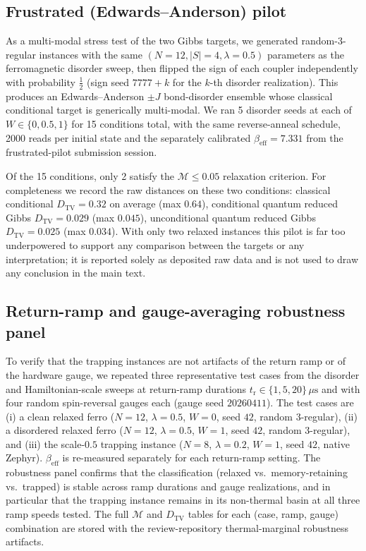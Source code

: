 \documentclass[aps,prapplied,reprint,superscriptaddress,floatfix,nofootinbib]{revtex4-2}
\begin{document}
\subsection{Frustrated (Edwards--Anderson) pilot}
\label{sec:phase6_frustrated}

As a multi-modal stress test of the two Gibbs targets, we generated
random-3-regular instances with the same $(N=12, |S|=4, \lambda=0.5)$
parameters as the ferromagnetic disorder sweep, then flipped the sign of each coupler
independently with probability $\tfrac12$ (sign seed $7777+k$ for the
$k$-th disorder realization).  This produces an Edwards--Anderson $\pm J$
bond-disorder ensemble whose classical conditional target is generically
multi-modal.  We ran 5 disorder seeds at each of $W\in\{0,0.5,1\}$ for
15 conditions total, with the same reverse-anneal schedule, 2000
reads per initial state and the separately calibrated
$\beta_\mathrm{eff}=7.331$ from the frustrated-pilot submission session.

Of the 15 conditions, only 2 satisfy the $\mathcal{M}\le0.05$ relaxation
criterion.  For completeness we record the raw distances on these two
conditions: classical conditional $D_\mathrm{TV}=0.32$ on average (max
$0.64$), conditional quantum reduced Gibbs $D_\mathrm{TV}=0.029$ (max
$0.045$), unconditional quantum reduced Gibbs $D_\mathrm{TV}=0.025$ (max
$0.034$).  With only two relaxed instances this pilot is far too
underpowered to support any comparison between the targets or any
interpretation; it is reported solely as deposited raw data and is not
used to draw any conclusion in the main text.

\subsection{Return-ramp and gauge-averaging robustness panel}
\label{sec:phase6_robustness}

To verify that the trapping instances are not artifacts of the return
ramp or of the hardware gauge, we repeated three representative test
cases from the disorder and Hamiltonian-scale sweeps at return-ramp durations
$t_\mathrm{r}\in\{1,5,20\}\,\mu\mathrm{s}$ and with four random
spin-reversal gauges each (gauge seed $20260411$).  The test cases are
(i) a clean relaxed ferro ($N=12$, $\lambda=0.5$, $W=0$, seed $42$,
random 3-regular), (ii) a disordered relaxed ferro ($N=12$,
$\lambda=0.5$, $W=1$, seed $42$, random 3-regular), and
(iii) the scale-$0.5$ trapping instance
($N=8$, $\lambda=0.2$, $W=1$, seed $42$, native Zephyr).
$\beta_\mathrm{eff}$ is re-measured separately for each return-ramp
setting.  The robustness panel confirms that the classification
(relaxed vs.\ memory-retaining vs.\ trapped) is stable across ramp
durations and gauge realizations, and in particular that the trapping
instance remains in its non-thermal basin at all three ramp speeds
tested.  The full $\mathcal{M}$ and $D_\mathrm{TV}$ tables for each
(case, ramp, gauge) combination are stored with the review-repository
thermal-marginal robustness artifacts.
\end{document}

